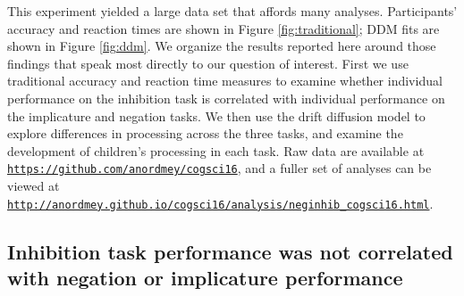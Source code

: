 \documentclass[10pt,letterpaper]{article}
\begin{document}
This experiment yielded a large data set that affords many analyses.  Participants' accuracy and reaction times are shown in Figure \ref{fig:traditional}; DDM fits are shown in Figure \ref{fig:ddm}. We organize the results reported here around those findings that speak most directly to our question of interest.  First we use traditional accuracy and reaction time measures to examine whether individual performance on the inhibition task is correlated with individual performance on the implicature and negation tasks. We then use the drift diffusion model to explore differences in processing across the three tasks, and examine the development of children's processing in each task.  Raw data are available at \href{https://github.com/anordmey/cogsci16}{\nolinkurl{https://github.com/anordmey/cogsci16}}, and a fuller set of analyses can be viewed at \href{http://anordmey.github.io/cogsci16/analysis/neginhib_cogsci16.html}{\nolinkurl{http://anordmey.github.io/cogsci16/analysis/neginhib_cogsci16.html}}.


\subsection{Inhibition task performance was not correlated with negation or implicature performance}

\end{document}
